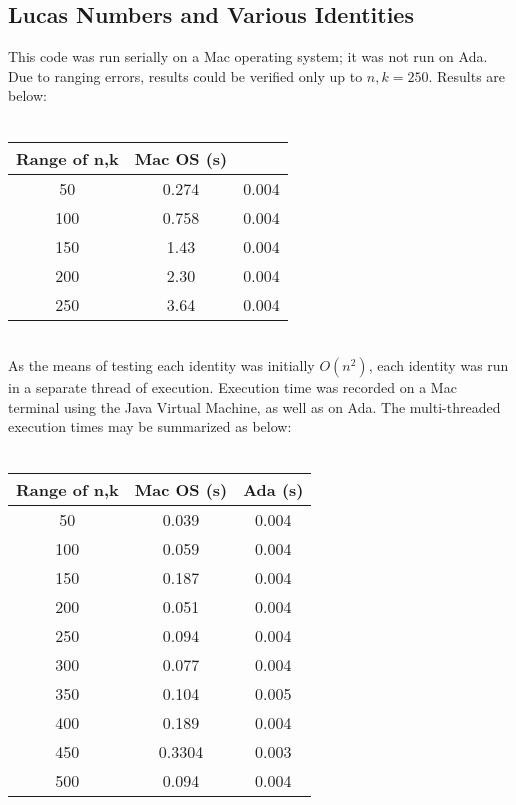 \documentclass[11pt]{article}
\begin{document}
\subsection{Lucas Numbers and Various Identities}
This code was run serially on a Mac operating system; it was not run on Ada. Due to ranging errors, results could be verified only up to $n,k=250$. Results are below: \\ \\
\begin{tabular}{ccc} \\
\hline
 Range of n,k & Mac OS (s)  \\ \hline
50 & 0.274 & 0.004\\
100 & 0.758 & 0.004 \\
150 & 1.43 & 0.004 \\
200 & 2.30 & 0.004 \\
250 & 3.64 & 0.004 \\ 
\hline \hline 
\end{tabular} \\
As the means of testing each identity was initially $O(n^{2})$, each identity was run in a separate thread of execution. Execution time was recorded on a Mac terminal using the Java Virtual Machine, as well as on Ada. The multi-threaded execution times may be summarized as below:\\ \\
\begin{tabular}{ccc}
\hline
 Range of n,k & Mac OS (s) & Ada (s) \\ \hline
50 & 0.039 & 0.004\\
100 & 0.059 & 0.004 \\
150 & 0.187 & 0.004 \\
200 & 0.051 & 0.004 \\
250 & 0.094 & 0.004 \\ 
300 & 0.077 & 0.004 \\
350 & 0.104 & 0.005 \\
400 & 0.189 & 0.004 \\
450 & 0.3304 & 0.003 \\
500 & 0.094 &0.004 \\ \hline \hline
\end{tabular} \\ \\
\end{document}
